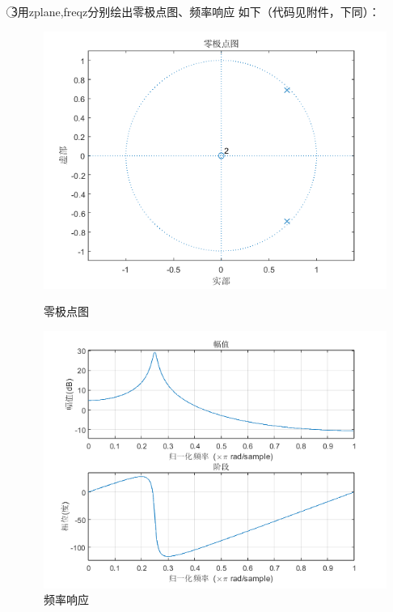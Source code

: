 \documentclass[10pt]{article}
\begin{document}
\textcircled{3}用zplane,freqz分别绘出零极点图、频率响应
如下（代码见附件，下同）：
\begin{figure}[htbp]
	\centering
	\begin{minipage}{0.49\linewidth}
		\centering
		\includegraphics[width=0.9\linewidth]{drawing1-1.png}
		\caption{零极点图}
	\end{minipage}
	\begin{minipage}{0.49\linewidth}
		\centering
		\includegraphics[width=0.9\linewidth]{drawing1-2.png}
		\caption{频率响应}
	\end{minipage}
\end{figure}
\end{document}
